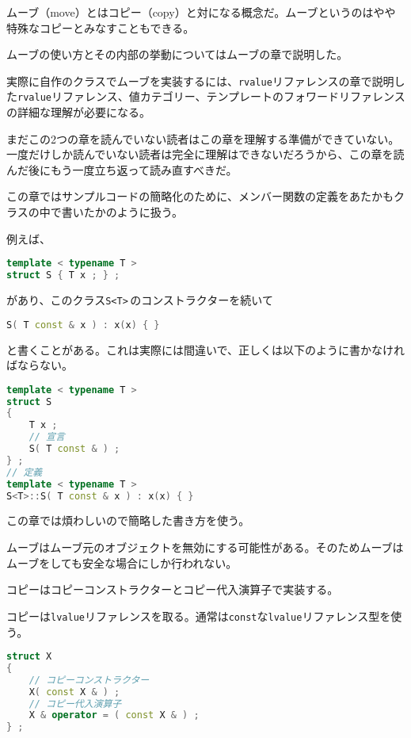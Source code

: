 
ムーブ（move）とはコピー（copy）と対になる概念だ。ムーブというのはやや特殊なコピーとみなすこともできる。

ムーブの使い方とその内部の挙動についてはムーブの章で説明した。

実際に自作のクラスでムーブを実装するには、\texttt{rvalue}リファレンスの章で説明した\texttt{rvalue}リファレンス、値カテゴリー、テンプレートのフォワードリファレンスの詳細な理解が必要になる。

まだこの2つの章を読んでいない読者はこの章を理解する準備ができていない。一度だけしか読んでいない読者は完全に理解はできないだろうから、この章を読んだ後にもう一度立ち返って読み直すべきだ。

この章ではサンプルコードの簡略化のために、メンバー関数の定義をあたかもクラスの中で書いたかのように扱う。

例えば、
\begin{lstlisting}[language={C++}]
template < typename T >
struct S { T x ; } ;
\end{lstlisting}
があり、このクラス\texttt{S<T>}\,のコンストラクターを続いて
\begin{lstlisting}[language={C++}]
S( T const & x ) : x(x) { }
\end{lstlisting}
と書くことがある。これは実際には間違いで、正しくは以下のように書かなければならない。

\ifTombow\pagebreak\fi
\begin{lstlisting}[language={C++}]
template < typename T >
struct S
{
    T x ;
    // 宣言
    S( T const & ) ;
} ;
// 定義
template < typename T >
S<T>::S( T const & x ) : x(x) { }
\end{lstlisting}

この章では煩わしいので簡略した書き方を使う。


ムーブはムーブ元のオブジェクトを無効にする可能性がある。そのためムーブはムーブをしても安全な場合にしか行われない。

コピーはコピーコンストラクターとコピー代入演算子で実装する。

コピーは\texttt{lvalue}リファレンスを取る。通常は\texttt{const}な\texttt{lvalue}リファレンス型を使う。

\begin{lstlisting}[language={C++}]
struct X
{
    // コピーコンストラクター
    X( const X & ) ;
    // コピー代入演算子
    X & operator = ( const X & ) ;
} ;
\end{lstlisting}

